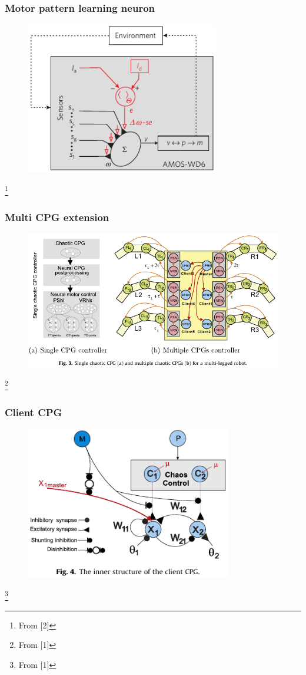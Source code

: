 \documentclass{beamer}
\begin{document}
\begin{frame}
\frametitle{Motor pattern learning neuron}
\begin{figure}
\center
\includegraphics[width=0.75\textwidth]{figs/motor-pattern-learning.pdf}
\end{figure}
\footnote{From [2]}
\end{frame}

\begin{frame}
\frametitle{Multi CPG extension}
\begin{figure}
\center
\includegraphics[width=1\textwidth]{figs/multi-CPG-extension.pdf}
\end{figure}
\footnote{From [1]}
\end{frame}

\begin{frame}
\frametitle{Client CPG}
\begin{figure}
\center
\includegraphics[width=0.8\textwidth]{figs/client-CPG.pdf}
\end{figure}
\footnote{From [1]}
\end{frame}
\end{document}
